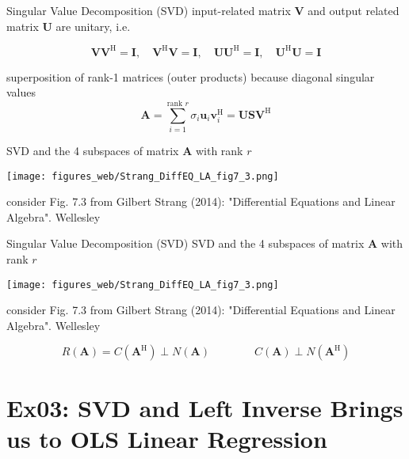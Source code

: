 \documentclass[mathserif, aspectratio=43]{intbeamer}
\begin{document}
\begin{frame}{Singular Value Decomposition (SVD)}
input-related matrix $\bm{V}$ and output related matrix $\bm{U}$ are unitary, i.e.

$$\bm{V}\bm{V}^\mathrm{H}=\bm{I},\quad\bm{V}^\mathrm{H}\bm{V}=\bm{I},\quad\bm{U}\bm{U}^\mathrm{H}=\bm{I},\quad\bm{U}^\mathrm{H}\bm{U}=\bm{I}$$

superposition of rank-1 matrices (outer products) because diagonal singular values
$$\bm{A} = \sum_{i=1}^{\text{rank }r} \sigma_i \bm{u}_i \bm{v}_i^\mathrm{H} = \bm{U} \bm{S} \bm{V}^\mathrm{H}$$

SVD and the 4 subspaces of matrix $\bm{A}$ with rank $r$
\begin{center}
\texttt{[image: figures\_web/Strang\_DiffEQ\_LA\_fig7\_3.png]}
\end{center}
\begin{footnotesize}consider Fig. 7.3 from Gilbert Strang (2014): "Differential Equations and Linear Algebra". Wellesley\end{footnotesize}

\end{frame}


\begin{frame}{Singular Value Decomposition (SVD)}
SVD and the 4 subspaces of matrix $\bm{A}$ with rank $r$
\begin{center}
\texttt{[image: figures\_web/Strang\_DiffEQ\_LA\_fig7\_3.png]}
\end{center}
\begin{footnotesize}consider Fig. 7.3 from Gilbert Strang (2014): "Differential Equations and Linear Algebra". Wellesley\end{footnotesize}

$$R(\bm{A}) = C(\bm{A}^\mathrm{H})\perp N(\bm{A})
\qquad\qquad C(\bm{A}) \perp N(\bm{A}^\mathrm{H})$$

\end{frame}


\section{Ex03: SVD and Left Inverse Brings us to OLS Linear Regression}
\end{document}
